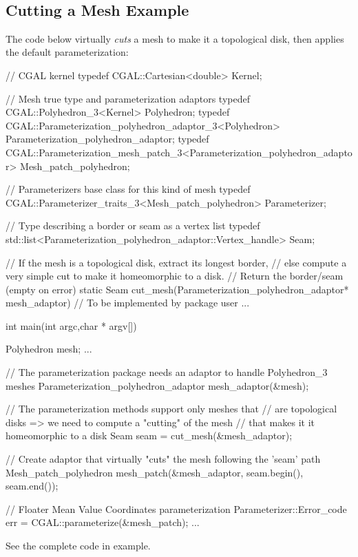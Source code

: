  \\


\subsection{Cutting a Mesh Example}

The code below virtually {\em cuts} a  mesh to make it a topological disk,
then applies the default parameterization:

\begin{ccExampleCode}

// CGAL kernel
typedef CGAL::Cartesian<double>                             Kernel;

// Mesh true type and parameterization adaptors
typedef CGAL::Polyhedron_3<Kernel>                          Polyhedron;
typedef CGAL::Parameterization_polyhedron_adaptor_3<Polyhedron>         
                                                            Parameterization_polyhedron_adaptor;
typedef CGAL::Parameterization_mesh_patch_3<Parameterization_polyhedron_adaptor> 
                                                            Mesh_patch_polyhedron;

// Parameterizers base class for this kind of mesh
typedef CGAL::Parameterizer_traits_3<Mesh_patch_polyhedron> Parameterizer;

// Type describing a border or seam as a vertex list
typedef std::list<Parameterization_polyhedron_adaptor::Vertex_handle>   
                                                            Seam;

// If the mesh is a topological disk, extract its longest border,
// else compute a very simple cut to make it homeomorphic to a disk.
// Return the border/seam (empty on error)
static Seam cut_mesh(Parameterization_polyhedron_adaptor* mesh_adaptor)
{
    // To be implemented by package user
    ...
}

int main(int argc,char * argv[])
{
    Polyhedron mesh;
    ...

    // The parameterization package needs an adaptor to handle Polyhedron_3 meshes
    Parameterization_polyhedron_adaptor mesh_adaptor(&mesh);

    // The parameterization methods support only meshes that
    // are topological disks => we need to compute a "cutting" of the mesh
    // that makes it it homeomorphic to a disk
    Seam seam = cut_mesh(&mesh_adaptor);

    // Create adaptor that virtually "cuts" the mesh following the 'seam' path
    Mesh_patch_polyhedron   mesh_patch(&mesh_adaptor,
                                       seam.begin(),
                                       seam.end());

    // Floater Mean Value Coordinates parameterization
    Parameterizer::Error_code err = CGAL::parameterize(&mesh_patch);
    ...
}

\end{ccExampleCode}

See the complete code in  example.


